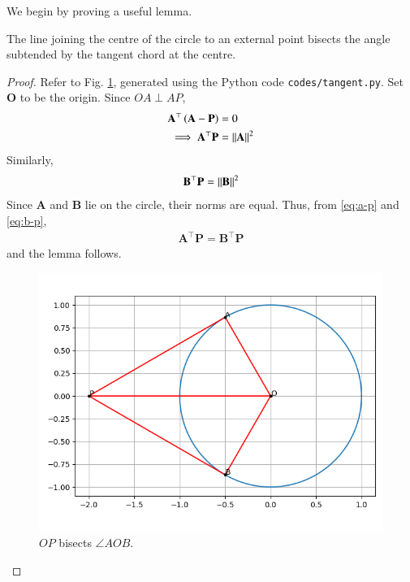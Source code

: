 \documentclass[journal,12pt,twocolumn]{IEEEtran}
\renewcommand{\vec}[1]{\boldsymbol{\mathbf{#1}}}
\begin{document}
\begin{enumerate}
    \solution We begin by proving a useful lemma.
    \begin{lemma}
        The line joining the centre of the circle to an external point bisects
        the angle subtended by the tangent chord at the centre.
    \end{lemma}
    \begin{proof}
        Refer to Fig. \ref{fig:tangent}, generated using the Python code 
        \texttt{codes/tangent.py}. Set $\vec{O}$ to be the origin. Since 
        $OA \perp AP$,
        \begin{align}
            \vec{A}^\top\brak{\vec{A}-\vec{P}} &= 0 \\
            \implies \vec{A}^\top\vec{P} &= \norm{\vec{A}}^2
            \label{eq:a-p}
        \end{align}
        Similarly,
        \begin{align}
            \vec{B}^\top\vec{P} = \norm{\vec{B}}^2
            \label{eq:b-p}
        \end{align}
        Since $\vec{A}$ and $\vec{B}$ lie on the circle, their norms are equal.
        Thus, from \eqref{eq:a-p} and \eqref{eq:b-p},
        \begin{align}
            \vec{A}^\top\vec{P} = \vec{B}^\top\vec{P}
        \end{align}
        and the lemma follows.
        \begin{figure}[!ht]
            \centering
            \includegraphics[width=\columnwidth]{figs/tangent.png}
            \caption{$OP$ bisects $\angle AOB$.}
            \label{fig:tangent}
        \end{figure}

\end{proof}
\end{enumerate}
\end{document}
